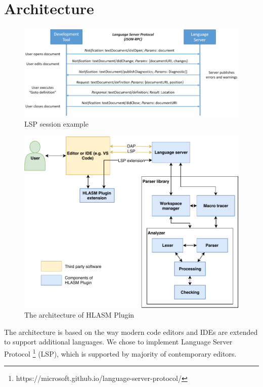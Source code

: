 \chapter{Architecture}


\begin{figure}
	\centering
	\includegraphics[width=\textwidth]{img/language-server-sequence}
	\caption{LSP session example }
	\label{fig04:LSP}
\end{figure}

\begin{figure}
	\centering
	\includegraphics[width=\textwidth]{img/hlasm_architecture}
	\caption{The architecture of HLASM Plugin}
	\label{fig04:arch}
\end{figure}



The architecture is based on the way modern code editors and IDEs are extended to support additional languages. We chose to implement Language Server Protocol \footnote{https://microsoft.github.io/language-server-protocol/} (LSP), which is supported by majority of contemporary editors.


